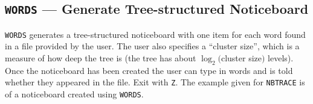 \documentclass[twoside,11pt,nolof]{starlink}
\begin{document}
\subsection {\texttt{WORDS} --- Generate Tree-structured Noticeboard}

\texttt{WORDS} generates a tree-structured noticeboard with one item for each
word found in a file provided by the user. The user also specifies a ``cluster
size'', which is a measure of how deep the tree is (the tree has about
$\log_{2} ($cluster size$)$ levels). Once the noticeboard has been created
the user can type in words and is told whether they appeared in the file.
Exit with \texttt{\wedge Z}. The example given for \texttt{NBTRACE} is of a noticeboard
created using \texttt{WORDS}.
\end{document}
